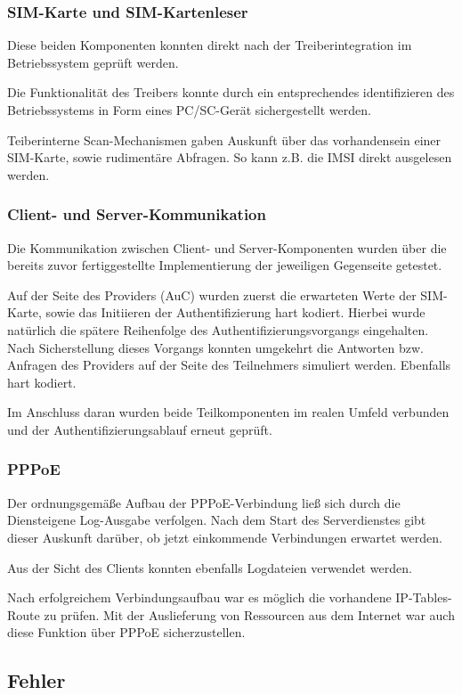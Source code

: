		\subsubsection{SIM-Karte und SIM-Kartenleser}
		Diese beiden Komponenten konnten direkt nach der Treiberintegration im Betriebssystem
		geprüft werden.

		Die Funktionalität des Treibers konnte durch ein entsprechendes identifizieren des
		Betriebssystems in Form eines PC/SC-Gerät sichergestellt werden.

		Teiberinterne Scan-Mechanismen gaben Auskunft über das vorhandensein einer SIM-Karte,
		sowie rudimentäre Abfragen. So kann z.B. die IMSI direkt ausgelesen werden.

		\subsubsection{Client- und Server-Kommunikation}
		Die Kommunikation zwischen Client- und Server-Komponenten wurden über die bereits zuvor
		fertiggestellte Implementierung der jeweiligen Gegenseite getestet.

		Auf der Seite des Providers (AuC) wurden zuerst die erwarteten Werte der SIM-Karte, sowie
		das Initiieren der Authentifizierung hart kodiert. Hierbei wurde natürlich die spätere
		Reihenfolge des Authentifizierungsvorgangs eingehalten. Nach Sicherstellung dieses Vorgangs
		konnten umgekehrt die Antworten bzw. Anfragen des Providers auf der Seite des Teilnehmers
		simuliert werden. Ebenfalls hart kodiert.

		Im Anschluss daran wurden beide Teilkomponenten im realen Umfeld verbunden und der
		Authentifizierungsablauf erneut geprüft.

		\subsubsection{PPPoE}
		Der ordnungsgemäße Aufbau der PPPoE-Verbindung ließ sich durch die Diensteigene
		Log-Ausgabe verfolgen. Nach dem Start des Serverdienstes gibt dieser Auskunft
		darüber, ob jetzt einkommende Verbindungen erwartet werden.

		Aus der Sicht des Clients konnten ebenfalls Logdateien verwendet werden.

		Nach erfolgreichem Verbindungsaufbau war es möglich die vorhandene
		IP-Tables-Route zu prüfen. Mit der Auslieferung von Ressourcen aus
		dem Internet war auch diese Funktion über PPPoE sicherzustellen.

	\subsection{Fehler}
	\label{subsec:fehler}
